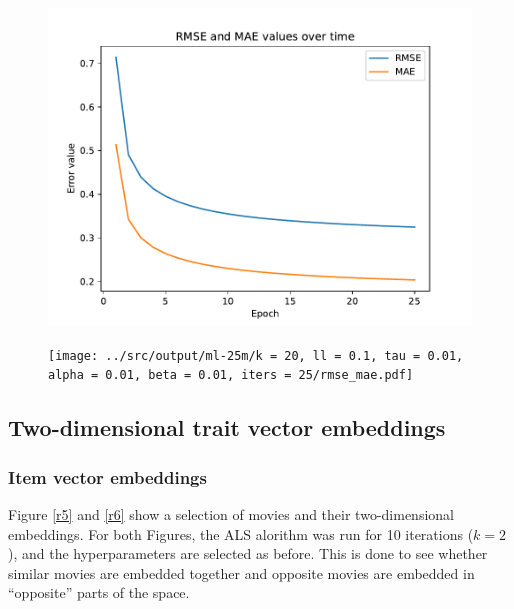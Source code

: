 \documentclass{article}
\begin{document}
\begin{figure}[h!]
    \centering
    \begin{minipage}{.5\textwidth}
      \centering
      \captionsetup{justification=centering}
      \includegraphics[width=\textwidth]{../src/output/small/k = 20, ll = 0.1, tau = 0.01, alpha = 0.01, beta = 0.01, iters = 25/rmse_mae.pdf}
      \label{r3}
    \end{minipage}%
    \begin{minipage}{.5\textwidth}
      \centering
      \captionsetup{justification=centering}
      \texttt{[image: ../src/output/ml-25m/k = 20, ll = 0.1, tau = 0.01, alpha = 0.01, beta = 0.01, iters = 25/rmse\_mae.pdf]}
      \label{r4}
    \end{minipage}
\end{figure}

\newpage

\subsection{Two-dimensional trait vector embeddings}

\subsubsection{Item vector embeddings}
Figure \ref{r5} and \ref{r6} show a selection of movies and their two-dimensional embeddings.
For both Figures, the ALS alorithm was run for 10 iterations ($k = 2$), and the hyperparameters are selected as before.
This is done to see whether similar movies are embedded together and opposite movies are embedded in ``opposite''
parts of the space.
\end{document}
